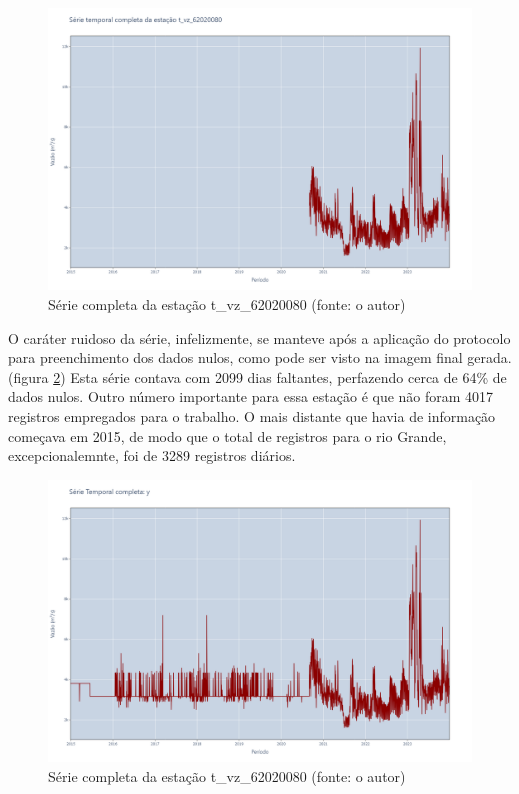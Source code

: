 \begin{figure}[!h]
\centering
\includegraphics[scale=0.25]{Figuras/rio_grande/rioGrandeSerieAlvoFaltantes.png}
\caption{Série completa da estação t\_vz\_62020080 (fonte: o autor)}
\label{fig:rioGrandeSerieAlvoFaltantes}
\end{figure}

O caráter ruidoso da série, infelizmente, se manteve após a aplicação do protocolo para preenchimento dos dados nulos, como pode ser visto na imagem final gerada. (figura \ref{fig:rioGrandeSerieAlvoImputados}) Esta série contava com 2099 dias faltantes, perfazendo cerca de 64\% de dados nulos. Outro número importante para essa estação é que não foram 4017 registros empregados para o trabalho. O mais distante que havia de informação começava em 2015, de modo que o total de registros para o rio Grande, excepcionalemnte, foi de 3289 registros diários.

\begin{figure}[!h]
\centering
\includegraphics[scale=0.25]{Figuras/rio_grande/rioGrandeSerieAlvoImputados.png}
\caption{Série completa da estação t\_vz\_62020080 (fonte: o autor)}
\label{fig:rioGrandeSerieAlvoImputados}
\end{figure}

